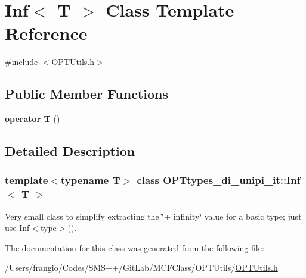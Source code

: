 \hypertarget{class_o_p_ttypes__di__unipi__it_1_1_inf}{}\section{Inf$<$ T $>$ Class Template Reference}
\label{class_o_p_ttypes__di__unipi__it_1_1_inf}


{\ttfamily \#include $<$O\+P\+T\+Utils.\+h$>$}

\subsection*{Public Member Functions}
\begin{DoxyCompactItemize}
\item 
\mbox{\label{class_o_p_ttypes__di__unipi__it_1_1_inf_a4b15b6419d4ff99730ee9df795b90f61}} 
{\bfseries operator T} ()
\end{DoxyCompactItemize}


\subsection{Detailed Description}
\subsubsection*{template$<$typename T$>$\newline
class O\+P\+Ttypes\+\_\+di\+\_\+unipi\+\_\+it\+::\+Inf$<$ T $>$}

Very small class to simplify extracting the \char`\"{}+ infinity\char`\"{} value for a basic type; just use Inf$<$type$>$(). 

The documentation for this class was generated from the following file\+:\begin{DoxyCompactItemize}
\item 
/\+Users/frangio/\+Codes/\+S\+M\+S++/\+Git\+Lab/\+M\+C\+F\+Class/\+O\+P\+T\+Utils/\mbox{\hyperlink{_o_p_t_utils_8h}{O\+P\+T\+Utils.\+h}}\end{DoxyCompactItemize}
